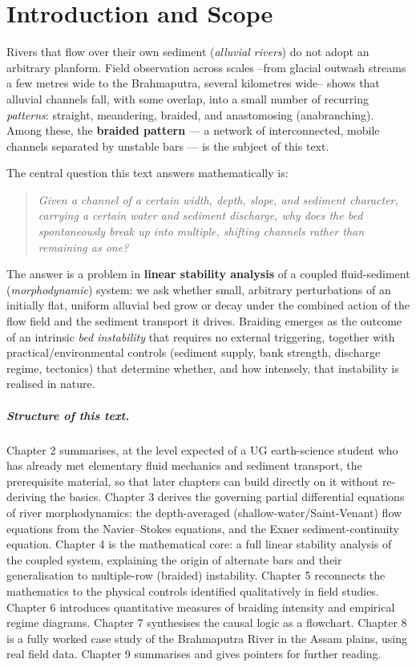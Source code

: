 \documentclass[11pt,a4paper]{report}
\theoremstyle{definition}
\theoremstyle{plain}
\theoremstyle{remark}
\begin{document}
\chapter{Introduction and Scope}

Rivers that flow over their own sediment (\emph{alluvial rivers}) do not adopt an arbitrary planform. Field observation across scales --from glacial outwash streams a few metres wide to the Brahmaputra, several kilometres wide-- shows that alluvial channels fall, with some overlap, into a small number of recurring \emph{patterns}: straight, meandering, braided, and anastomosing (anabranching). Among these, the \textbf{braided pattern} --- a network of interconnected, mobile channels separated by unstable bars --- is the subject of this text.

The central question this text answers mathematically is:
\begin{quote}
\itshape Given a channel of a certain width, depth, slope, and sediment character, carrying a certain water and sediment discharge, why does the bed spontaneously break up into multiple, shifting channels rather than remaining as one?
\end{quote}

The answer is a problem in \textbf{linear stability analysis} of a coupled fluid-sediment (\emph{morphodynamic}) system: we ask whether small, arbitrary perturbations of an initially flat, uniform alluvial bed grow or decay under the combined action of the flow field and the sediment transport it drives. Braiding emerges as the outcome of an intrinsic \emph{bed instability} that requires no external triggering, together with practical/environmental controls (sediment supply, bank strength, discharge regime, tectonics) that determine whether, and how intensely, that instability is realised in nature.

\paragraph{Structure of this text.} Chapter 2 summarises, at the level expected of a UG earth-science student who has already met elementary fluid mechanics and sediment transport, the prerequisite material, so that later chapters can build directly on it without re-deriving the basics. Chapter 3 derives the governing partial differential equations of river morphodynamics: the depth-averaged (shallow-water/Saint-Venant) flow equations from the Navier--Stokes equations, and the Exner sediment-continuity equation. Chapter 4 is the mathematical core: a full linear stability analysis of the coupled system, explaining the origin of alternate bars and their generalisation to multiple-row (braided) instability. Chapter 5 reconnects the mathematics to the physical controls identified qualitatively in field studies. Chapter 6 introduces quantitative measures of braiding intensity and empirical regime diagrams. Chapter 7 synthesises the causal logic as a flowchart. Chapter 8 is a fully worked case study of the Brahmaputra River in the Assam plains, using real field data. Chapter 9 summarises and gives pointers for further reading.
\end{document}
